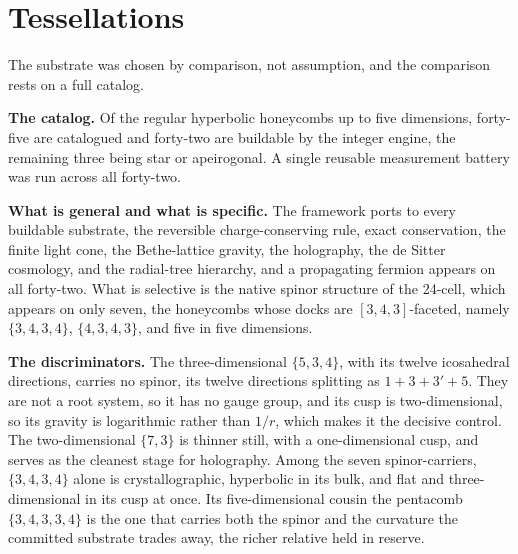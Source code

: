 \section{Tessellations}

The substrate was chosen by comparison, not assumption, and the comparison rests on a full catalog.

\textbf{The catalog.} Of the regular hyperbolic honeycombs up to five dimensions, forty-five are catalogued and forty-two are buildable by the integer engine, the remaining three being star or apeirogonal. A single reusable measurement battery was run across all forty-two.

\textbf{What is general and what is specific.} The framework ports to every buildable substrate, the reversible charge-conserving rule, exact conservation, the finite light cone, the Bethe-lattice gravity, the holography, the de Sitter cosmology, and the radial-tree hierarchy, and a propagating fermion appears on all forty-two. What is selective is the native spinor structure of the 24-cell, which appears on only seven, the honeycombs whose docks are $[3,4,3]$-faceted, namely $\{3,4,3,4\}$, $\{4,3,4,3\}$, and five in five dimensions.

\textbf{The discriminators.} The three-dimensional $\{5,3,4\}$, with its twelve icosahedral directions, carries no spinor, its twelve directions splitting as $1+3+3'+5$. They are not a root system, so it has no gauge group, and its cusp is two-dimensional, so its gravity is logarithmic rather than $1/r$, which makes it the decisive control. The two-dimensional $\{7,3\}$ is thinner still, with a one-dimensional cusp, and serves as the cleanest stage for holography. Among the seven spinor-carriers, $\{3,4,3,4\}$ alone is crystallographic, hyperbolic in its bulk, and flat and three-dimensional in its cusp at once. Its five-dimensional cousin the pentacomb $\{3,4,3,3,4\}$ is the one that carries both the spinor and the curvature the committed substrate trades away, the richer relative held in reserve.
